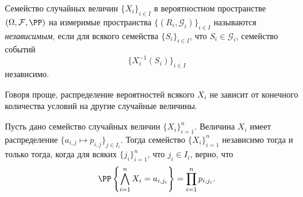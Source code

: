 \documentclass[12pt,a4paper]{article}
\begin{document}
    \begin{definition}
        Семейство случайных величин $\{X_i\}_{i \in I}$ в вероятностном пространстве $(\Omega, \mathcal{F}, \PP)$ на измеримые пространства $\{(R_i, \mathcal{G}_i)\}_{i \in I}$ называются \emph{независимым}, если для всякого семейства $\{S_i\}_{i \in I}$, что $S_i \in \mathcal{G}_i$, семейство событий
        \[\{X_i^{-1}(S_i)\}_{i \in I}\]
        независимо.

        Говоря проще, распределение вероятностей всякого $X_i$ не зависит от конечного количества условий на другие случайные величины.
    \end{definition}

    \begin{theorem}
        Пусть дано семейство случайных величин $\{X_i\}_{i=1}^n$. Величина $X_i$ имеет распределение $\{a_{i, j} \mapsto p_{i, j}\}_{j \in I_i}$. Тогда семейство $\{X_i\}_{i=1}^n$ независимо тогда и только тогда, когда для всяких $\{j_i\}_{i = 1}^n$, что $j_i \in I_i$, верно, что
        \[\PP\left\{\bigwedge_{i=1}^n X_i = a_{i, j_i}\right\} = \prod_{i=1}^n p_{i, j_i}.\]
    \end{theorem}
\end{document}
